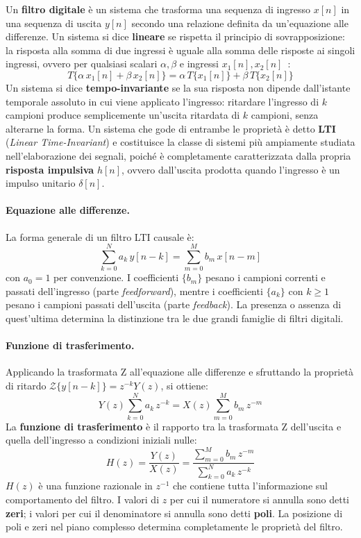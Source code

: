 Un \textbf{filtro digitale} è un sistema che trasforma una sequenza di ingresso $x[n]$ in una sequenza di uscita $y[n]$ secondo una relazione definita da un'equazione alle differenze. Un sistema si dice \textbf{lineare} se rispetta il principio di sovrapposizione: la risposta alla somma di due ingressi è uguale alla somma delle risposte ai singoli ingressi, ovvero per qualsiasi scalari $\alpha, \beta$ e ingressi $x_1[n], x_2[n]$~\cite{oppenheim1997dsp}:
\[
T\{\alpha\, x_1[n] + \beta\, x_2[n]\} =
\alpha\, T\{x_1[n]\} + \beta\, T\{x_2[n]\}
\]
Un sistema si dice \textbf{tempo-invariante} se la sua risposta non dipende dall'istante temporale assoluto in cui viene applicato l'ingresso: ritardare l'ingresso di $k$ campioni produce semplicemente un'uscita ritardata di $k$ campioni, senza alterarne la forma. Un sistema che gode di entrambe le proprietà è detto \textbf{LTI} (\textit{Linear Time-Invariant}) e costituisce la classe di sistemi più ampiamente studiata nell'elaborazione dei segnali, poiché è completamente caratterizzata dalla propria \textbf{risposta impulsiva} $h[n]$, ovvero dall'uscita prodotta quando l'ingresso è un impulso unitario $\delta[n]$.

\paragraph{Equazione alle differenze.}
La forma generale di un filtro LTI causale è:
\[
\sum_{k=0}^{N} a_k\, y[n-k] = \sum_{m=0}^{M} b_m\, x[n-m]
\]
con $a_0 = 1$ per convenzione. I coefficienti $\{b_m\}$ pesano i campioni correnti e passati dell'ingresso (parte \textit{feedforward}), mentre i coefficienti $\{a_k\}$ con $k \geq 1$ pesano i campioni passati dell'uscita (parte \textit{feedback}). La presenza o assenza di quest'ultima determina la distinzione tra le due grandi famiglie di filtri digitali.

\paragraph{Funzione di trasferimento.}
Applicando la trasformata Z all'equazione alle differenze e sfruttando la proprietà di ritardo $\mathcal{Z}\{y[n-k]\} = z^{-k} Y(z)$, si ottiene:
\[
Y(z) \sum_{k=0}^{N} a_k\, z^{-k} =
X(z) \sum_{m=0}^{M} b_m\, z^{-m}
\]
La \textbf{funzione di trasferimento} è il rapporto tra la trasformata Z dell'uscita e quella dell'ingresso a condizioni iniziali nulle:
\[
H(z) = \frac{Y(z)}{X(z)} =
\frac{\displaystyle\sum_{m=0}^{M} b_m\, z^{-m}}
{\displaystyle\sum_{k=0}^{N} a_k\, z^{-k}}
\]
$H(z)$ è una funzione razionale in $z^{-1}$ che contiene tutta l'informazione sul comportamento del filtro. I valori di $z$ per cui il numeratore si annulla sono detti \textbf{zeri}; i valori per cui il denominatore si annulla sono detti \textbf{poli}. La posizione di poli e zeri nel piano complesso determina completamente le proprietà del filtro.

